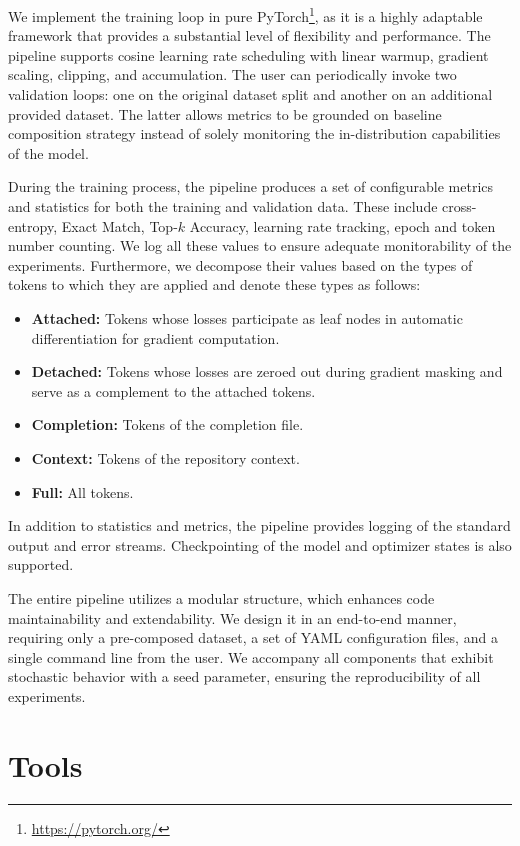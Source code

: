We implement the training loop in pure PyTorch\footnote{\url{https://pytorch.org/}}, as it is a highly adaptable framework that provides a substantial level of flexibility and performance. The pipeline supports cosine learning rate scheduling with linear warmup, gradient scaling, clipping, and accumulation. The user can periodically invoke two validation loops: one on the original dataset split and another on an additional provided dataset. The latter allows metrics to be grounded on baseline composition strategy instead of solely monitoring the in-distribution capabilities of the model.

During the training process, the pipeline produces a set of configurable metrics and statistics for both the training and validation data. These include cross-entropy, Exact Match, Top-\(k\) Accuracy, learning rate tracking, epoch and token number counting. We log all these values to ensure adequate monitorability of the experiments. Furthermore, we decompose their values based on the types of tokens to which they are applied and denote these types as follows:
\begin{itemize}
    \item \textbf{Attached:} Tokens whose losses participate as leaf nodes in automatic differentiation for gradient computation.
    \item \textbf{Detached:} Tokens whose losses are zeroed out during gradient masking and serve as a complement to the attached tokens.
    \item \textbf{Completion:} Tokens of the completion file.
    \item \textbf{Context:} Tokens of the repository context.
    \item \textbf{Full:} All tokens.
\end{itemize}

In addition to statistics and metrics, the pipeline provides logging of the standard output and error streams. Checkpointing of the model and optimizer states is also supported.

The entire pipeline utilizes a modular structure, which enhances code maintainability and extendability. We design it in an end-to-end manner, requiring only a pre-composed dataset, a set of YAML configuration files, and a single command line from the user. We accompany all components that exhibit stochastic behavior with a seed parameter, ensuring the reproducibility of all experiments.

\section{Tools}

